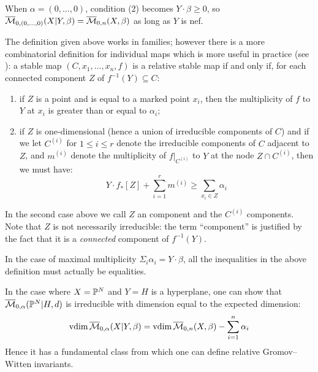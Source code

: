\begin{remark} When $\alpha = (0, \ldots, 0)$, condition (2) becomes $Y \cdot \beta \geq 0$, so $\overline{\mathcal M}_{0,(0,\ldots,0)}(X|Y,\beta) = \overline{\mathcal M}_{0,n}(X,\beta)$ as long as $Y$ is nef.\end{remark}

\begin{remark} The definition given above works in families; however there is a more combinatorial definition for individual maps which is more useful in practice (see \cite[Remark 1.4]{Ga}): a stable map $(C,x_1, \ldots, x_n,f)$ is a relative stable map if and only if, for each connected component $Z$ of $f^{-1}(Y) \subseteq C$:
\begin{enumerate}
\item if $Z$ is a point and is equal to a marked point $x_i$, then the multiplicity of $f$ to $Y$ at $x_i$ is greater than or equal to $\alpha_i$;
\item if $Z$ is one-dimensional (hence a union of irreducible components of $C$) and if we let $C^{(i)}$ for $1 \leq i \leq r$ denote the irreducible components of $C$ adjacent to $Z$, and $m^{(i)}$ denote the multiplicity of $f|_{C^{(i)}}$ to $Y$ at the node $Z \cap C^{(i)}$, then we must have:
\begin{equation} \label{Relative stable map internal component inequality} Y \cdot f_* [Z] + \sum_{i=1}^r m^{(i)} \geq \sum_{x_i \in Z} \alpha_i \end{equation}
\end{enumerate} \end{remark}

\begin{remark}In the second case above we call $Z$ an  component and the $C^{(i)}$  components. Note that $Z$ is not necessarily irreducible: the term ``component'' is justified by the fact that it is a \emph{connected} component of $f^{-1}(Y)$. \end{remark}

\begin{remark} In the case of maximal multiplicity $\Sigma_{i} \alpha_i = Y \cdot \beta$, all the inequalities in the above definition must actually be equalities. \end{remark}

In the case where $X=\mathbb P^N$ and $Y=H$ is a hyperplane, one can show that $\overline{\mathcal M}_{0,\alpha}(\mathbb P^N|H,d)$ is irreducible with dimension equal to the expected dimension:
\begin{equation*} \operatorname{vdim} \overline{\mathcal M}_{0,\alpha}(X|Y,\beta) = \operatorname{vdim}{\overline{\mathcal M}_{0,n}(X,\beta)} - \sum_{i=1}^n \alpha_i \end{equation*}
Hence it has a fundamental class from which one can define relative Gromov--Witten invariants.

